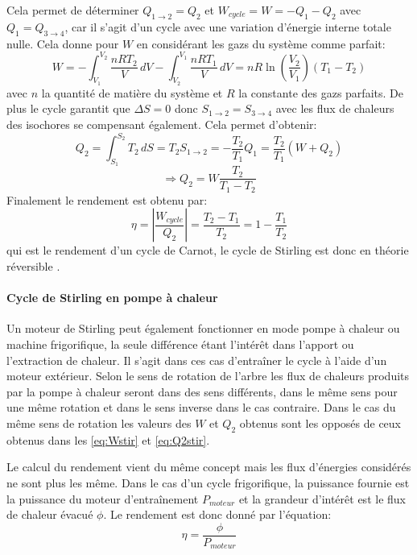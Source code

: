 Cela permet de déterminer \(Q_{1\to2} = Q_2\) et \(W_{cycle} = W = -Q_1 - Q_2\) avec \(Q_1 = Q_{3\to4}\), car il s'agit d'un cycle avec une variation d'énergie interne totale nulle. Cela donne pour \(W\) en considérant les gazs du système comme parfait:
\begin{equation}
    W = - \int_{V_1}^{V_2} \frac{nRT_2}{V} \, dV - \int_{V_2}^{V_1} \frac{nRT_1}{V} \, dV = nR\ln\left(\frac{V_2}{V_1}\right) (T_1 - T_2)
    \label{eq:Wstir}
\end{equation}
avec \(n\) la quantité de matière du système et \(R\) la constante des gazs parfaits.
De plus le cycle garantit que \(\Delta S = 0\) donc \(S_{1\to2} = S_{3\to4}\) avec les flux de chaleurs des isochores se compensant également. Cela permet d'obtenir:
\begin{equation}
    Q_2 = \int_{S_1}^{S_2} T_2 \, dS = T_2 S_{1\to2} = -\frac{T_2}{T_1} Q_1 = \frac{T_2}{T_1} (W + Q_2)
\end{equation}
\begin{equation}
    \Rightarrow Q_2 = W \frac{T_2}{T_1 - T_2}
    \label{eq:Q2stir}
\end{equation}
Finalement le rendement est obtenu par:
\begin{equation}
    \eta = \left|\frac{W_{cycle}}{Q_2}\right| = \frac{T_2 - T_1}{T_2} = 1 - \frac{T_1}{T_2}
    \label{eq:rend-theorie}
\end{equation}
qui est le rendement d'un cycle de Carnot, le cycle de Stirling est donc en théorie réversible \cite{cours-thermo}.



\paragraph*{Cycle de Stirling en pompe à chaleur}
Un moteur de Stirling peut également fonctionner en mode pompe à chaleur ou machine frigorifique, la seule différence étant l'intérêt dans l'apport ou l'extraction de chaleur. Il s'agit dans ces cas d'entraîner le cycle à l'aide d'un moteur extérieur. Selon le sens de rotation de l'arbre les flux de chaleurs produits par la pompe à chaleur seront dans des sens différents, dans le même sens pour une même rotation et dans le sens inverse dans le cas contraire. Dans le cas du même sens de rotation les valeurs des \(W\) et \(Q_2\) obtenus sont les opposés de ceux obtenus dans les \autoref{eq:Wstir} et \autoref{eq:Q2stir}.

Le calcul du rendement vient du même concept mais les flux d'énergies considérés ne sont plus les même. Dans le cas d'un cycle frigorifique, la puissance fournie est la puissance du moteur d'entraînement \(P_{moteur}\) et la grandeur d'intérêt est le flux de chaleur évacué \(\phi\). Le rendement est donc donné par l'équation:
\begin{equation}
    \eta = \frac{\phi}{P_{moteur}}
    \label{eq:rend-frigo}
\end{equation}